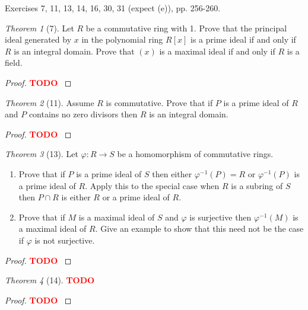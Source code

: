 \documentclass[12pt]{article}
\theoremstyle{remark}
\theoremstyle{named}
\newtheorem*{theorem}{Theorem}
\newcommand{\todo}{\textcolor{red}{\textbf{TODO} }}
\begin{document}
Exercises 7, 11, 13, 14, 16, 30, 31 (expect (e)), pp. 256-260.

\begin{theorem}[7]
    Let \(R\) be a commutative ring with 1. Prove that the principal ideal generated by \(x\) in the polynomial ring \(R[x]\) is a prime ideal if and only if \(R\) is an integral domain. Prove that \((x)\) is a maximal ideal if and only if \(R\) is a field.
\end{theorem}

\begin{proof}
    \todo
\end{proof}

\begin{theorem}[11]
    Assume \(R\) is commutative. Prove that if \(P\) is a prime ideal of \(R\) and \(P\) contains no zero divisors then \(R\) is an integral domain.
\end{theorem}

\begin{proof}
    \todo
\end{proof}

\begin{theorem}[13]
    Let \(\varphi : R \to S\) be a homomorphism of commutative rings. 
    \begin{enumerate}
        \item Prove that if \(P\) is a prime ideal of \(S\) then either \(\varphi^{-1}(P) = R\) or \(\varphi^{-1}(P)\) is a prime ideal of \(R\). Apply this to the special case when \(R\) is a subring of \(S\) then \(P \cap R\) is either \(R\) or a prime ideal of \(R\).
        \item Prove that if \(M\) is a maximal ideal of \(S\) and \(\varphi\) is surjective then \(\varphi^{-1}(M)\) is a maximal ideal of \(R\). Give an example to show that this need not be the case if \(\varphi\) is not surjective.
    \end{enumerate}
\end{theorem}

\begin{proof}
    \todo
\end{proof}

\begin{theorem}[14]
    \todo
\end{theorem}

\begin{proof}
    \todo
\end{proof}
\end{document}
